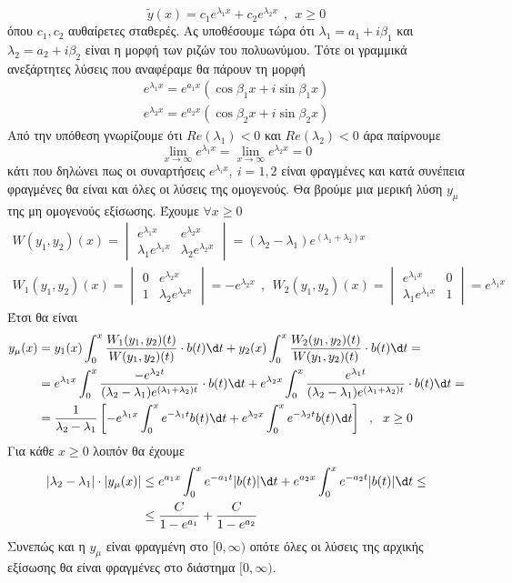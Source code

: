 \documentclass[a4paper,twoside,11pt]{book}
\DeclareRobustCommand{\frac}[3][0pt]{%
{\begingroup\hspace{#1}#2\hspace{#1}\endgroup\over\hspace{#1}#3\hspace{#1}}}
\begin{document}
\[ \tilde{y}(x)=c_1e^{\lambda_1x}+c_2e^{\lambda_2x}\ \ ,\ \ x\geq 0 \]
όπου $ c_1,c_2 $ αυθαίρετες σταθερές. Ας υποθέσουμε τώρα ότι $ \lambda_1=a_1+i\beta_1 $ και $ \lambda_2=a_2+i\beta_2 $ είναι η μορφή των ριζών του πολυωνύμου. Τότε οι γραμμικά ανεξάρτητες λύσεις που αναφέραμε θα πάρουν τη μορφή
\begin{gather*}
e^{\lambda_1x}=e^{a_1x}\left(\cos{\beta_1 x}+i\sin{\beta_1x}\right)\\
e^{\lambda_2x}=e^{a_2x}\left(\cos{\beta_2 x}+i\sin{\beta_2x}\right)
\end{gather*}
Από την υπόθεση γνωρίζουμε ότι $ Re(\lambda_1)<0 $ και $ Re(\lambda_2)<0 $ άρα παίρνουμε
\[ \lim_{x\to\infty}{e^{\lambda_1x}}=\lim_{x\to\infty}{e^{\lambda_2x}}=0 \]
κάτι που δηλώνει πως οι συναρτήσεις $ e^{\lambda_ix},\ i=1,2 $ είναι φραγμένες και κατά συνέπεια φραγμένες θα είναι και όλες οι λύσεις της ομογενούς.
Θα βρούμε μια μερική λύση $ y_\mu $ της μη ομογενούς εξίσωσης. Έχουμε $ \forall x\geq 0 $
\begin{gather*}
W(y_1,y_2)(x)=\begin{vmatrix}
e^{\lambda_1x} & e^{\lambda_2x}\\\lambda_1e^{\lambda_1x} & \lambda_2e^{\lambda_2x}
\end{vmatrix}=(\lambda_2-\lambda_1)e^{(\lambda_1+\lambda_2)x}\\
W_1(y_1,y_2)(x)=\begin{vmatrix}
0 & e^{\lambda_2x}\\1 & \lambda_2e^{\lambda_2x}
\end{vmatrix}=-e^{\lambda_2x}\ \ ,\ \ W_2(y_1,y_2)(x)=\begin{vmatrix}
e^{\lambda_1x} & 0\\\lambda_1e^{\lambda_1x} & 1
\end{vmatrix}=e^{\lambda_1x}
\end{gather*}
Έτσι θα είναι
\begin{align*}
y_\mu(x)&=y_1(x)\int_{0}^{x}{\frac{W_1(y_1,y_2)(t)}{W(y_1,y_2)(t)}\cdot b(t)\d t}+y_2(x)\int_{0}^{x}{\frac{W_2(y_1,y_2)(t)}{W(y_1,y_2)(t)}\cdot b(t)\d t}=\\&=e^{\lambda_1x}\int_{0}^{x}{\frac{-e^{\lambda_2t}}{(\lambda_2-\lambda_1)e^{(\lambda_1+\lambda_2)t}}\cdot b(t)\d t}+e^{\lambda_2x}\int_{0}^{x}{\frac{e^{\lambda_1t}}{(\lambda_2-\lambda_1)e^{(\lambda_1+\lambda_2)t}}\cdot b(t)\d t}=\\&=
\frac{1}{\lambda_2-\lambda_1}\left[ -e^{\lambda_1x}\int_{0}^{x}{e^{-\lambda_1 t}b(t)\d t}+e^{\lambda_2x}\int_{0}^{x}{e^{-\lambda_2 t}b(t)\d t} \right]\ \ ,\ \ x\geq 0
\end{align*}
Για κάθε $ x\geq 0 $ λοιπόν θα έχουμε
\begin{align*}
|\lambda_2-\lambda_1|\cdot|y_\mu(x)|&\leq e^{a_1x}\int_{0}^{x}{e^{-a_1t}|b(t)|\d t}+e^{a_2x}\int_{0}^{x}{e^{-a_2t}|b(t)|\d t}\leq\\
&\leq\frac{C}{1-e^{a_1}}+\frac{C}{1-e^{a_2}}
\end{align*}
Συνεπώς και η $ y_\mu $ είναι φραγμένη στο $ [0,\infty) $ οπότε όλες οι λύσεις της αρχικής εξίσωσης θα είναι φραγμένες στο διάστημα $ [0,\infty) $.
\end{document}
